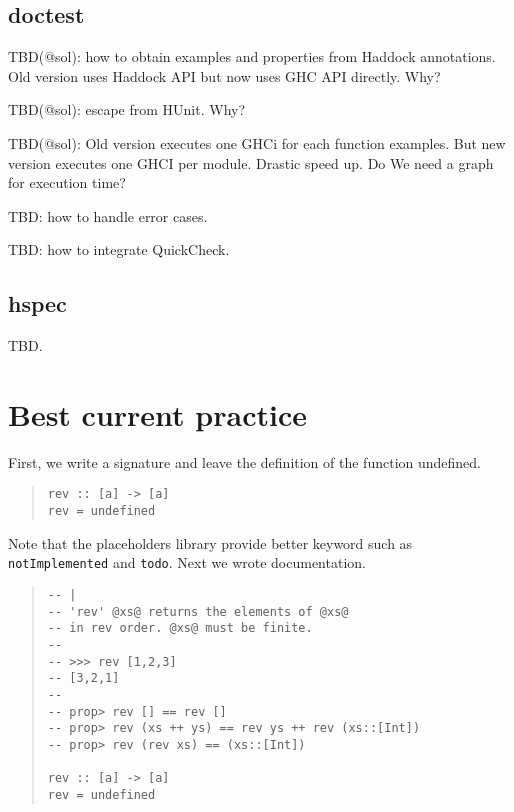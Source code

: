 \documentclass[preprint]{sigplanconf}
\begin{document}
\subsection{doctest}

TBD(@sol): how to obtain examples and properties from Haddock annotations.
Old version uses Haddock API but now uses GHC API directly. Why?

TBD(@sol): escape from HUnit. Why?

TBD(@sol): Old version executes one GHCi for each function examples.
But new version executes one GHCI per module.
Drastic speed up. Do We need a graph for execution time?

TBD: how to handle error cases.

TBD: how to integrate QuickCheck.

\subsection{hspec}

TBD.

\section{Best current practice}

First, we write a signature and leave the definition of the function undefined.

\begin{quote}
\begin{verbatim}
rev :: [a] -> [a]
rev = undefined
\end{verbatim}
\end{quote}

\noindent Note that the placeholders library provide better keyword such as {\tt notImplemented} and {\tt todo}. Next we wrote documentation.

\begin{quote}
\begin{verbatim}
-- |
-- 'rev' @xs@ returns the elements of @xs@
-- in rev order. @xs@ must be finite.
-- 
-- >>> rev [1,2,3]
-- [3,2,1]
--
-- prop> rev [] == rev []
-- prop> rev (xs ++ ys) == rev ys ++ rev (xs::[Int])
-- prop> rev (rev xs) == (xs::[Int])

rev :: [a] -> [a]
rev = undefined
\end{verbatim}
\end{quote}
\end{document}
